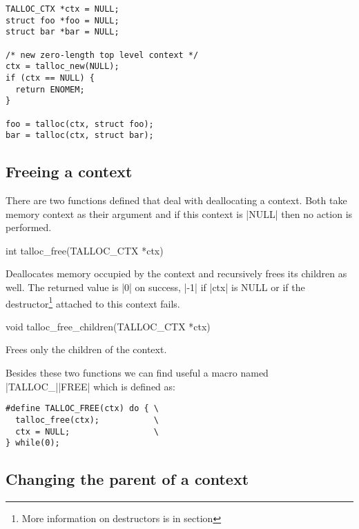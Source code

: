 \begin{lstlisting}[caption={talloc_new()},label=lst:talloc_new]
TALLOC_CTX *ctx = NULL;
struct foo *foo = NULL;
struct bar *bar = NULL;

/* new zero-length top level context */
ctx = talloc_new(NULL);
if (ctx == NULL) {
  return ENOMEM;
}

foo = talloc(ctx, struct foo);
bar = talloc(ctx, struct bar);
\end{lstlisting}

\subsection{Freeing a context}
\label{talloc:subsec:free-context}

There are two functions defined that deal with deallocating a context. Both
take memory context as their argument and if this context is |NULL| then no
action is performed.

\begin{funcproto}
int talloc_free(TALLOC_CTX *ctx)
\end{funcproto}
\begin{funcdesc}
  Deallocates memory occupied by the context and recursively frees its 
  children as well. The returned value is |0| on success, |-1| if |ctx| is NULL
  or if the destructor\footnote{More information on destructors is in section
  } attached to this context fails.
\end{funcdesc}
\begin{funcproto}
void talloc_free_children(TALLOC_CTX *ctx)
\end{funcproto}
\begin{funcdesc}
  Frees only the children of the context.
\end{funcdesc}
\funclistend
Besides these two functions we can find useful a macro named |TALLOC_||FREE|
which is defined as:

\begin{lstlisting}[caption={TALLOC_FREE(ctx)},label=lst:TALLOC_FREE]
#define TALLOC_FREE(ctx) do { \
  talloc_free(ctx);           \
  ctx = NULL;                 \
} while(0);
\end{lstlisting}



\subsection{Changing the parent of a context}
\label{talloc:subsec:stealing}

